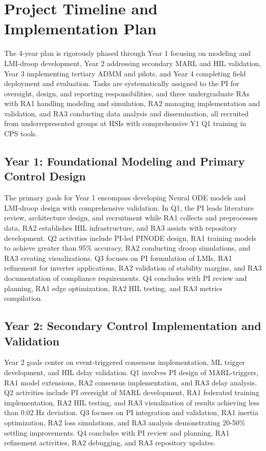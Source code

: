 \documentclass[12pt]{article}
\begin{document}
\section{Project Timeline and Implementation Plan}

The 4-year plan is rigorously phased through Year 1 focusing on modeling and LMI-droop development, Year 2 addressing secondary MARL and HIL validation, Year 3 implementing tertiary ADMM and pilots, and Year 4 completing field deployment and evaluation. Tasks are systematically assigned to the PI for oversight, design, and reporting responsibilities, and three undergraduate RAs with RA1 handling modeling and simulation, RA2 managing implementation and validation, and RA3 conducting data analysis and dissemination, all recruited from underrepresented groups at HSIs with comprehensive Y1 Q1 training in CPS tools.

\subsection{Year 1: Foundational Modeling and Primary Control Design}

The primary goals for Year 1 encompass developing Neural ODE models and LMI-droop design with comprehensive validation. In Q1, the PI leads literature review, architecture design, and recruitment while RA1 collects and preprocesses data, RA2 establishes HIL infrastructure, and RA3 assists with repository development. Q2 activities include PI-led PINODE design, RA1 training models to achieve greater than 95\% accuracy, RA2 conducting droop simulations, and RA3 creating visualizations. Q3 focuses on PI formulation of LMIs, RA1 refinement for inverter applications, RA2 validation of stability margins, and RA3 documentation of compliance requirements. Q4 concludes with PI review and planning, RA1 edge optimization, RA2 HIL testing, and RA3 metrics compilation.

\subsection{Year 2: Secondary Control Implementation and Validation}

Year 2 goals center on event-triggered consensus implementation, ML trigger development, and HIL delay validation. Q1 involves PI design of MARL-triggers, RA1 model extensions, RA2 consensus implementation, and RA3 delay analysis. Q2 activities include PI oversight of MARL development, RA1 federated training implementation, RA2 HIL testing, and RA3 visualization of results achieving less than 0.02 Hz deviation. Q3 focuses on PI integration and validation, RA1 inertia optimization, RA2 loss simulations, and RA3 analysis demonstrating 20-50\% settling improvements. Q4 concludes with PI review and planning, RA1 refinement activities, RA2 debugging, and RA3 repository updates.
\end{document}
